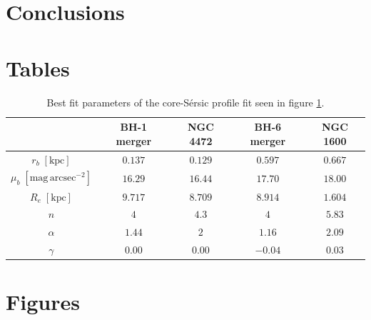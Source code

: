 \documentclass[english, oneside]{HYgradu}
\begin{document}
\begin{figure}
	\label{figure:profile_comparison}
\end{figure}


\chapter{Conclusions}

\appendix

\chapter{Tables}

\begin{table}
	\begin{center}
		\scriptsize
		\begin{tabular}{| c | c c | c c |}
		\hline
		 & BH-1 merger & NGC 4472 & BH-6 merger & NGC 1600 \\
		\hline
		$r_b \; \mathrm{[kpc]}$ & $0.137$ & $0.129$ & $0.597$ & $0.667$ \\
		$\mu_b \; \mathrm{[mag \, arcsec^{-2}]}$ & $16.29$ & $16.44$ & $17.70$ & $18.00$ \\
		$R_e \; \mathrm{[kpc]}$ & $9.717$ & $8.709$ & $8.914$ & $1.604$ \\
		$n$ & $4$ & $4.3$ & $4$ & $5.83$ \\
		$\alpha$ & $1.44$ & $2$ & $1.16$ & $2.09$ \\
		$\gamma$ & $0.00$ & $0.00$ & $-0.04$ & $0.03$ \\
		\hline
		\end{tabular}
	\end{center}
	\caption{Best fit parameters of the core-Sérsic profile fit seen in figure \ref{figure:profile_comparison}.}
	\label{table:bestfit_parameter_comparison}
\end{table}

\chapter{Figures}
\end{document}
